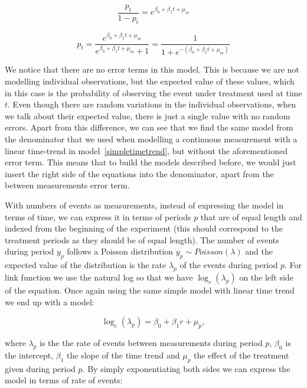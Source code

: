 \documentclass[12pt,a4paper,leqno]{report}
\theoremstyle{plain}
\theoremstyle{definition}
\theoremstyle{remark}
\begin{document}
\begin{def}\label{}
    \begin{equation}\label{}
        \frac{p_t}{1-p_t}=e^{\beta_0 + \beta_1 t + \mu_m}
    \end{equation}
\end{def}

\begin{def}\label{}
    \begin{equation}\label{}
        p_t=\frac{e^{\beta_0 + \beta_1 t + \mu_m}}{e^{\beta_0 + \beta_1 t + \mu_m}+1}=\frac{1}{1+e^{-(\beta_0 + \beta_1 t + \mu_m)}}
    \end{equation}
\end{def}

We notice that there are no error terms in this model. This is because we are
not modelling individual observations, but the expected value of these values, which in
this case is the probability of observing the event under treatment used at time \(t\).
Even though there are random variations in the individual observations,
when we talk about their expected value, there is just a single value with no
random errors. Apart from this difference, we can see that we find the same model
from the denominator that we used when modelling a continuous measurement with a
linear time-trend in model\ \ref{simpletimetrend}, but without the
aforementioned error term. This means that to build the models described before,
we would just insert the right side of the equations into the denominator, apart
from the between measurements error term.

With numbers of events as measurements, instead of expressing the model in terms
of time, we can express it in terms of periods \(p\) that are of equal length
and indexed from the beginning of the experiment (this should correspond to the
treatment periods as they should be of equal length). The number of events during
period \(y_p\) follows a Poisson distribution \(y_p \sim Poisson(\lambda)\) and
the expected value of the distribution is the rate \(\lambda_p \) of the events
during period \(p\). For link function we use the natural log so that we have
\(\log_e(\lambda_p)\) on the left side of the equation. Once again using the
same simple model with linear time trend we end up with a model:

\begin{def}\label{oneerror}
    \begin{equation}
        \log_e(\lambda_p)=\beta_0 + \beta_1 r + \mu_{p},
    \end{equation}
\end{def}where \(\lambda_p\) is the the rate of events between measurements
during period \(p\), \(\beta_0\) is the intercept, \(\beta_1\) the slope of the
time trend and \(\mu_p\) the effect of the treatment given during period \(p\).
By simply exponentiating both sides we can express the model in terms of rate of
events:
\end{document}
